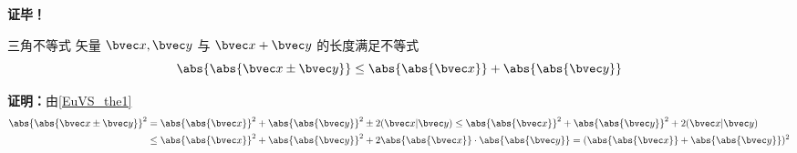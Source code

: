 \textbf{证毕！}
\begin{corollary}{三角不等式}\label{EuVS_cor1}
矢量 $\bvec x,\bvec y$ 与 $\bvec x+\bvec y$ 的长度满足不等式
\begin{equation}
\abs{\abs{\bvec x\pm\bvec y}}\leq\abs{\abs{\bvec x}}+\abs{\abs{\bvec y}}
\end{equation}
\end{corollary}
\textbf{证明：}由\autoref{EuVS_the1} 
\begin{equation}
\begin{aligned}
\abs{\abs{\bvec x\pm\bvec y}}^2&=\abs{\abs{\bvec x}}^2+\abs{\abs{\bvec y}}^2\pm2(\bvec x|\bvec y)\leq\abs{\abs{\bvec x}}^2+\abs{\abs{\bvec y}}^2+2(\bvec x|\bvec y)\\
&\leq \abs{\abs{\bvec x}}^2+\abs{\abs{\bvec y}}^2+2\abs{\abs{\bvec x}}\cdot\abs{\abs{\bvec y}}=(\abs{\abs{\bvec x}}+\abs{\abs{\bvec y}})^2
\end{aligned}
\end{equation}

